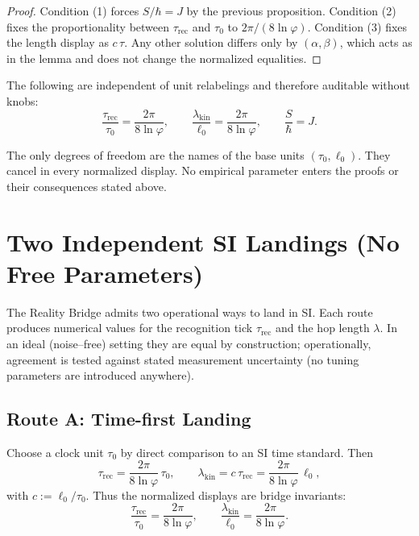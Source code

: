 \documentclass[11pt]{article}
\theoremstyle{plain}
\theoremstyle{definition}
\theoremstyle{remark}
\begin{document}
\begin{proof}
Condition (1) forces \(S/\hbar=J\) by the previous proposition. Condition (2) fixes the proportionality between \(\tau_{\mathrm{rec}}\) and \(\tau_{0}\) to \(2\pi/(8\ln\varphi)\). Condition (3) fixes the length display as \(c\,\tau\). Any other solution differs only by \((\alpha,\beta)\), which acts as in the lemma and does not change the normalized equalities.
\end{proof}

\begin{corollary}
The following are independent of unit relabelings and therefore auditable without knobs:
\[
\frac{\tau_{\mathrm{rec}}}{\tau_{0}}=\frac{2\pi}{8\ln\varphi},\qquad
\frac{\lambda_{\mathrm{kin}}}{\ell_{0}}=\frac{2\pi}{8\ln\varphi},\qquad
\frac{S}{\hbar}=J.
\]
\end{corollary}

\begin{remark}[No knobs]
The only degrees of freedom are the names of the base units \((\tau_{0},\ell_{0})\). They cancel in every normalized display. No empirical parameter enters the proofs or their consequences stated above.
\end{remark}

\section{Two Independent SI Landings (No Free Parameters)}
The Reality Bridge admits two operational ways to land in SI. Each route produces numerical values for the recognition tick \(\tau_{\mathrm{rec}}\) and the hop length \(\lambda\). In an ideal (noise–free) setting they are equal by construction; operationally, agreement is tested against stated measurement uncertainty (no tuning parameters are introduced anywhere).

\subsection*{Route A: Time-first Landing}
Choose a clock unit \(\tau_{0}\) by direct comparison to an SI time standard. Then
\[
\tau_{\mathrm{rec}}=\frac{2\pi}{8\ln\varphi}\,\tau_{0},
\qquad
\lambda_{\mathrm{kin}}=c\,\tau_{\mathrm{rec}}=\frac{2\pi}{8\ln\varphi}\,\ell_{0},
\]
with \(c:=\ell_{0}/\tau_{0}\). Thus the normalized displays are bridge invariants:
\[
\frac{\tau_{\mathrm{rec}}}{\tau_{0}}=\frac{2\pi}{8\ln\varphi},
\qquad
\frac{\lambda_{\mathrm{kin}}}{\ell_{0}}=\frac{2\pi}{8\ln\varphi}.
\]
\end{document}

